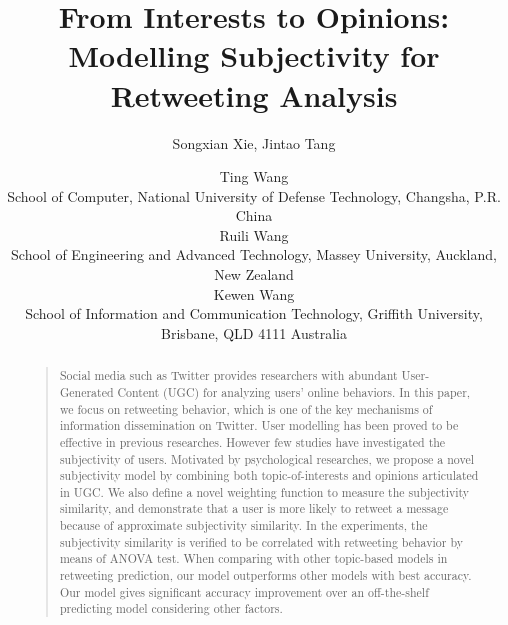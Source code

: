 \documentclass[letterpaper]{article}
\begin{document}
%
\title{From Interests to Opinions: \\Modelling Subjectivity for Retweeting Analysis}
\author{Songxian Xie, Jintao Tang \and Ting Wang\\
School of Computer, National University of Defense Technology, Changsha, P.R. China\\
\AND Ruili Wang\\
School of Engineering and Advanced Technology, Massey University, Auckland, New Zealand\\
\AND Kewen Wang\\
School of Information and Communication Technology, Griffith University, Brisbane, QLD 4111 Australia\\
}
\maketitle
\begin{abstract}
\begin{quote}
Social media such as Twitter provides researchers with abundant User-Generated Content (UGC) for analyzing users' online behaviors.  In this paper, we focus on retweeting behavior, which is one of the key mechanisms of information dissemination on Twitter. 
User modelling has been proved to be effective in previous researches. However few studies have investigated the subjectivity of users. 
Motivated by psychological researches, we propose a novel subjectivity model by combining both topic-of-interests and opinions articulated in UGC. 
We also define a novel weighting function to measure the subjectivity similarity, and demonstrate that a user is more likely to retweet a message because of approximate subjectivity similarity.  
In the experiments, the subjectivity similarity is verified to be correlated with retweeting behavior by means of ANOVA test. 
When comparing with other topic-based models in retweeting prediction, our model outperforms other models with best accuracy. Our model gives significant accuracy improvement over an off-the-shelf predicting model considering other factors.
\end{quote}
\end{abstract}
\end{document}
